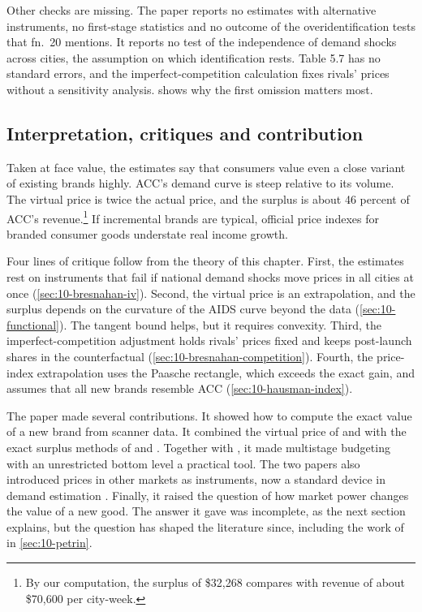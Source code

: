 Other checks are missing. The paper reports no estimates with alternative instruments, no first-stage
statistics and no outcome of the overidentification tests that fn.~20 mentions. It reports no test of the
independence of demand shocks across cities, the assumption on which identification rests. Table 5.7 has no
standard errors, and the imperfect-competition calculation fixes rivals' prices without a sensitivity
analysis.  shows why the first omission matters most.

\subsection{Interpretation, critiques and contribution}\label{sec:10-hausman-assessment}

Taken at face value, the estimates say that consumers value even a close variant of existing brands
highly. ACC's demand curve is steep relative to its volume. The virtual price is twice the actual price, and
the surplus is about 46 percent of ACC's revenue.\footnote{By our computation, the surplus of \$32,268 compares with revenue of
about \$70,600 per city-week.} If incremental brands are typical, official price indexes for branded
consumer goods understate real income growth.

Four lines of critique follow from the theory of this chapter. First, the estimates rest on instruments that
fail if national demand shocks move prices in all cities at once (\cref{sec:10-bresnahan-iv}). Second, the
virtual price is an extrapolation, and the surplus depends on the curvature of the AIDS curve beyond the data
(\cref{sec:10-functional}). The tangent bound helps, but it requires convexity. Third, the
imperfect-competition adjustment holds rivals' prices fixed and keeps post-launch shares in the
counterfactual (\cref{sec:10-bresnahan-competition}). Fourth, the price-index extrapolation uses the Paasche
rectangle, which exceeds the exact gain, and assumes that all new brands resemble ACC
(\cref{sec:10-hausman-index}).

The paper made several contributions. It showed how to compute the exact value of a new brand from scanner
data. It combined the virtual price of \citet{Hicks1940} and \citet{Rothbarth1941} with the exact surplus
methods of \citet{Hausman1981} and \citet{HausmanNewey1995}. Together with \citet{HausmanLeonardZona1994}, it
made multistage budgeting with an unrestricted bottom level a practical tool. The two papers also introduced
prices in other markets as instruments, now a standard device in demand estimation \citep{Nevo2001}. Finally, it raised the question of how market power changes the value of
a new good. The answer it gave was incomplete, as the next section explains, but the question has shaped the
literature since, including the work of \citet{Petrin2002} in \cref{sec:10-petrin}.

